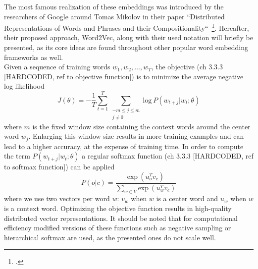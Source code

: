 The most famous realization of these embeddings was introduced by the researchers of Google around Tomas Mikolov in their paper “Distributed Representations of Words and Phrases and their Compositionality“~\footcite{DBLP:journals/corr/MikolovSCCD13}. Hereafter, their proposed approach, Word2Vec, along with their used notation will briefly be presented, as its core ideas are found throughout other popular word embedding frameworks as well. \\
Given a sequence of training words $ w_1, w_2, \dots, w_T $, the objective (ch 3.3.3 [HARDCODED, ref to objective function]) is to minimize the average negative log likelihood
\begin{equation}
	\label{eqn:skip_gram_objective_function}
	J(\theta) = - \frac{1}{T} \sum_{t=1}^{T} \sum_{\substack{-m \leq j \leq m \\ j \neq 0}} \text{log} \ P(w_{t+j} | w_t; \theta)
\end{equation}
where $ m $ is the fixed window size containing the context words around the center word $ w_j $. Enlarging this window size results in more training examples and can lead to a higher accuracy, at the expense of training time. In order to compute the term $ P(w_{t+j} | w_t; \theta) $ a regular softmax function (ch 3.3.3 [HARDCODED, ref to softmax function]) can be applied
\begin{equation}
	\label{eqn:skip_gram_conditional_probability}
	P(o | c) = \frac{\text{exp} \ (u_{o}^{T} v_{c})}{\sum_{w \in V} \text{exp} \ (u_{w}^{T} v_c)}
\end{equation}
where we use two vectors per word $ w $: $ v_w $ when $ w $ is a center word and $ u_w $ when $ w $ is a context word. Optimizing the objective function results in high-quality distributed vector representations. It should be noted that for computational efficiency modified versions of these functions such as negative sampling or hierarchical softmax are used, as the presented ones do not scale well.

